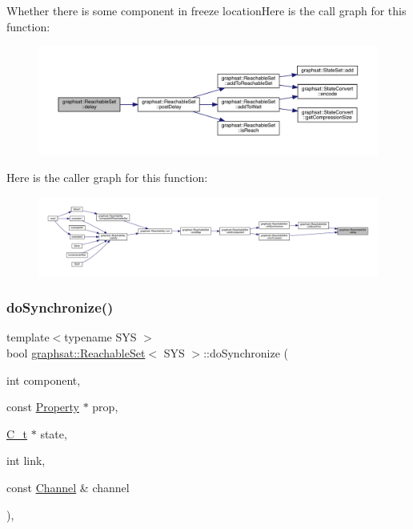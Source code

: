 Whether there is some component in freeze locationHere is the call graph for this function\+:
\nopagebreak
\begin{figure}[H]
\begin{center}
\leavevmode
\includegraphics[width=350pt]{classgraphsat_1_1_reachable_set_a51f36ef46b73abadf53cd04975924448_cgraph}
\end{center}
\end{figure}
Here is the caller graph for this function\+:
\nopagebreak
\begin{figure}[H]
\begin{center}
\leavevmode
\includegraphics[width=350pt]{classgraphsat_1_1_reachable_set_a51f36ef46b73abadf53cd04975924448_icgraph}
\end{center}
\end{figure}
\mbox{\label{classgraphsat_1_1_reachable_set_a8ce33ab357efdf1308823c7c66a590b1}} 
\subsubsection{\texorpdfstring{doSynchronize()}{doSynchronize()}}
{\footnotesize\ttfamily template$<$typename S\+YS $>$ \\
bool \mbox{\hyperlink{classgraphsat_1_1_reachable_set}{graphsat\+::\+Reachable\+Set}}$<$ S\+YS $>$\+::do\+Synchronize (\begin{DoxyParamCaption}\item[{int}]{component,  }\item[{const \mbox{\hyperlink{classgraphsat_1_1_property}{Property}} $\ast$}]{prop,  }\item[{\mbox{\hyperlink{classgraphsat_1_1_reachable_set_a0b7981a216ec4c46be913e08d5f0cd07}{C\+\_\+t}} $\ast$}]{state,  }\item[{int}]{link,  }\item[{const \mbox{\hyperlink{structgraphsat_1_1_channel}{Channel}} \&}]{channel }\end{DoxyParamCaption})\hspace{0.3cm}{\ttfamily [inline]}, {\ttfamily [private]}}


